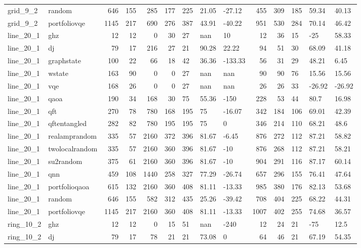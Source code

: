 \begin{longtable}{llrrrrlllrrlll}
grid\_9\_2 & random & 646 & 155 & 285 & 177 & 225 & 21.05 & -27.12 & 455 & 309 & 185 & 59.34 & 40.13 \\
grid\_9\_2 & portfoliovqe & 1145 & 217 & 690 & 276 & 387 & 43.91 & -40.22 & 951 & 530 & 284 & 70.14 & 46.42 \\
line\_20\_1 & ghz & 12 & 12 & 0 & 30 & 27 & nan & 10 & 12 & 36 & 15 & -25 & 58.33 \\
line\_20\_1 & dj & 79 & 17 & 216 & 27 & 21 & 90.28 & 22.22 & 94 & 51 & 30 & 68.09 & 41.18 \\
line\_20\_1 & graphstate & 100 & 22 & 66 & 18 & 42 & 36.36 & -133.33 & 56 & 31 & 29 & 48.21 & 6.45 \\
line\_20\_1 & wstate & 163 & 90 & 0 & 0 & 27 & nan & nan & 90 & 90 & 76 & 15.56 & 15.56 \\
line\_20\_1 & vqe & 168 & 26 & 0 & 0 & 27 & nan & nan & 26 & 26 & 33 & -26.92 & -26.92 \\
line\_20\_1 & qaoa & 190 & 34 & 168 & 30 & 75 & 55.36 & -150 & 228 & 53 & 44 & 80.7 & 16.98 \\
line\_20\_1 & qft & 270 & 78 & 780 & 168 & 195 & 75 & -16.07 & 342 & 184 & 106 & 69.01 & 42.39 \\
line\_20\_1 & qftentangled & 282 & 82 & 780 & 195 & 195 & 75 & 0 & 346 & 214 & 110 & 68.21 & 48.6 \\
line\_20\_1 & realamprandom & 335 & 57 & 2160 & 372 & 396 & 81.67 & -6.45 & 876 & 272 & 112 & 87.21 & 58.82 \\
line\_20\_1 & twolocalrandom & 335 & 57 & 2160 & 360 & 396 & 81.67 & -10 & 876 & 268 & 112 & 87.21 & 58.21 \\
line\_20\_1 & su2random & 375 & 61 & 2160 & 360 & 396 & 81.67 & -10 & 904 & 291 & 116 & 87.17 & 60.14 \\
line\_20\_1 & qnn & 459 & 108 & 1440 & 258 & 327 & 77.29 & -26.74 & 657 & 296 & 155 & 76.41 & 47.64 \\
line\_20\_1 & portfolioqaoa & 615 & 132 & 2160 & 360 & 408 & 81.11 & -13.33 & 985 & 380 & 176 & 82.13 & 53.68 \\
line\_20\_1 & random & 646 & 155 & 582 & 312 & 435 & 25.26 & -39.42 & 708 & 404 & 225 & 68.22 & 44.31 \\
line\_20\_1 & portfoliovqe & 1145 & 217 & 2160 & 360 & 408 & 81.11 & -13.33 & 1007 & 402 & 255 & 74.68 & 36.57 \\
ring\_10\_2 & ghz & 12 & 12 & 0 & 15 & 51 & nan & -240 & 12 & 24 & 21 & -75 & 12.5 \\
ring\_10\_2 & dj & 79 & 17 & 78 & 21 & 21 & 73.08 & 0 & 64 & 46 & 21 & 67.19 & 54.35 \\

\end{longtable}
